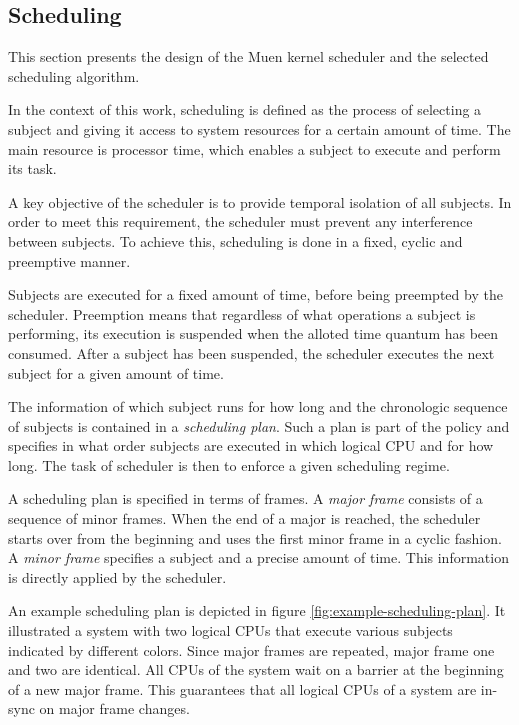 \subsection{Scheduling}\label{subsec:scheduling}
This section presents the design of the Muen kernel scheduler and the selected
scheduling algorithm.

In the context of this work, scheduling is defined as the process of selecting
a subject and giving it access to system resources for a certain amount of time.
The main resource is processor time, which enables a subject to execute and
perform its task.

A key objective of the scheduler is to provide temporal isolation of all
subjects. In order to meet this requirement, the scheduler must prevent any
interference between subjects. To achieve this, scheduling is done in a fixed,
cyclic and preemptive manner.

Subjects are executed for a fixed amount of time, before being preempted by the
scheduler. Preemption means that regardless of what operations a subject is
performing, its execution is suspended when the alloted time quantum has been
consumed. After a subject has been suspended, the scheduler executes the next
subject for a given amount of time.

The information of which subject runs for how long and the chronologic sequence
of subjects is contained in a \emph{scheduling plan}.
Such a plan is part of the policy and specifies in what order subjects are
executed in which logical CPU and for how long. The task of scheduler is then to
enforce a given scheduling regime.

A scheduling plan is specified in terms of frames. A \emph{major frame}
 consists of a sequence of minor frames. When the end of a
major is reached, the scheduler starts over from the beginning and uses the
first minor frame in a cyclic fashion. A \emph{minor frame}
specifies a subject and a precise amount of time. This information is directly
applied by the scheduler.

An example scheduling plan is depicted in figure
\ref{fig:example-scheduling-plan}. It illustrated a system with two logical CPUs
that execute various subjects indicated by different colors. Since major frames
are repeated, major frame one and two are identical. All CPUs of the system
wait on a barrier at the beginning of a new major frame. This guarantees that
all logical CPUs of a system are in-sync on major frame changes.

